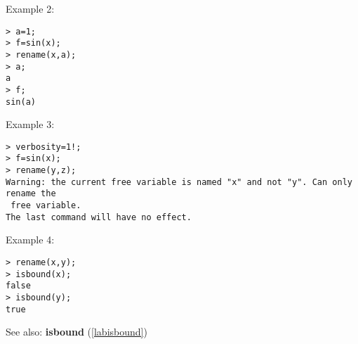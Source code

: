 \noindent Example 2: 
\begin{center}\begin{minipage}{15cm}\begin{Verbatim}[frame=single]
> a=1;
> f=sin(x);
> rename(x,a);
> a;
a
> f;
sin(a)
\end{Verbatim}
\end{minipage}\end{center}
\noindent Example 3: 
\begin{center}\begin{minipage}{15cm}\begin{Verbatim}[frame=single]
> verbosity=1!;
> f=sin(x);
> rename(y,z);
Warning: the current free variable is named "x" and not "y". Can only rename the
 free variable.
The last command will have no effect.
\end{Verbatim}
\end{minipage}\end{center}
\noindent Example 4: 
\begin{center}\begin{minipage}{15cm}\begin{Verbatim}[frame=single]
> rename(x,y);
> isbound(x);
false
> isbound(y);
true
\end{Verbatim}
\end{minipage}\end{center}
See also: \textbf{isbound} (\ref{labisbound})
